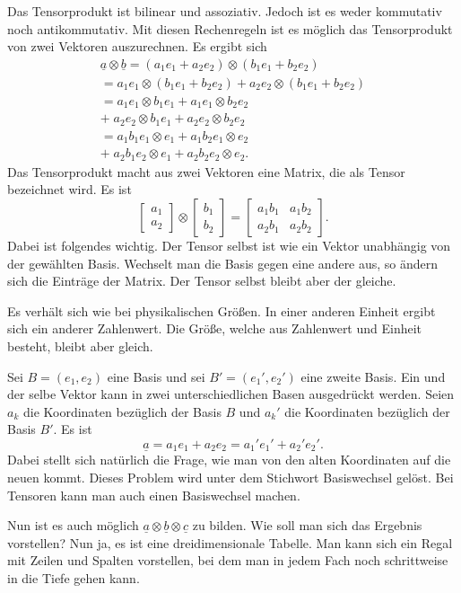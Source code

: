 \documentclass[a4paper,10pt,fleqn,twocolumn,twoside]{article}
\begin{document}
Das Tensorprodukt ist bilinear und assoziativ. Jedoch ist es
weder kommutativ noch antikommutativ. Mit diesen Rechenregeln
ist es möglich das Tensorprodukt von zwei Vektoren auszurechnen.
Es ergibt sich
\begin{gather*}
\underline a\otimes\underline b
= (a_1e_1+a_2e_2)\otimes (b_1e_1+b_2e_2)\\
= a_1e_1\otimes (b_1e_1+b_2e_2)
+ a_2e_2\otimes (b_1e_1+b_2e_2)\\
= a_1e_1\otimes b_1e_1+a_1e_1\otimes b_2e_2\\
+\; a_2e_2\otimes b_1e_1+a_2e_2\otimes b_2e_2\\
= a_1b_1 e_1\otimes e_1+a_1b_2 e_1\otimes e_2\\
+\; a_2b_1 e_2\otimes e_1+a_2b_2 e_2\otimes e_2.
\end{gather*}
\noindent
Das Tensorprodukt macht aus zwei Vektoren eine Matrix, die als Tensor
bezeichnet wird. Es ist
\[\begin{bmatrix}a_1\\ a_2\end{bmatrix}\otimes
\begin{bmatrix}b_1\\ b_2\end{bmatrix}
=\begin{bmatrix}
a_1b_1 & a_1b_2\\
a_2b_1 & a_2b_2
\end{bmatrix}.\]
\noindent
Dabei ist folgendes wichtig. Der Tensor selbst ist wie ein Vektor
unabhängig von der gewählten Basis. Wechselt man die Basis gegen
eine andere aus, so ändern sich die Einträge der Matrix. Der Tensor
selbst bleibt aber der gleiche.

Es verhält sich wie bei physikalischen Größen.
In einer anderen Einheit ergibt sich ein anderer Zahlenwert.
Die Größe, welche aus Zahlenwert und Einheit besteht, bleibt aber
gleich.

Sei \(B=(e_1,e_2)\) eine Basis und sei \(B'=(e_1',e_2')\) eine zweite
Basis. Ein und der selbe Vektor kann in zwei unterschiedlichen Basen
ausgedrückt werden. Seien \(a_k\) die Koordinaten bezüglich der
Basis \(B\) und \(a_k'\) die Koordinaten bezüglich der Basis \(B'\).
Es ist
\[\underline a = a_1e_1+a_2e_2 = a_1'e_1'+a_2'e_2'.\]
Dabei stellt sich natürlich die Frage, wie man von den alten
Koordinaten auf die neuen kommt. Dieses Problem wird unter dem
Stichwort Basiswechsel gelöst. Bei Tensoren kann man auch einen
Basiswechsel machen.

Nun ist es auch möglich
\(\underline a\otimes\underline b\otimes \underline c\)
zu bilden. Wie soll man sich das Ergebnis vorstellen? Nun ja,
es ist eine dreidimensionale Tabelle. Man kann sich ein Regal mit
Zeilen und Spalten vorstellen, bei dem man in jedem Fach noch
schrittweise in die Tiefe gehen kann.
\end{document}
